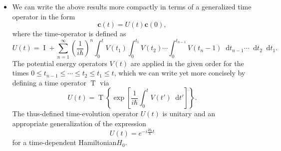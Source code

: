 \documentclass[11pt, a4paper]{article}
\newcommand{\diff}{\mathop{}\!\mathrm{d}} %
\newcommand{\Ham}{Hamiltonian\xspace}
\renewcommand{\vec}[1]{\bm{#1}}  %
\newcommand{\II}{\operatorname{I}}  %
\begin{document}
\begin{itemize}
    \item We can write the above results more compactly in terms of a generalized time operator in the form
    \begin{equation*}
        \vec{c}(t) = U(t)\vec{c}(0),
    \end{equation*}
    where the time-operator is defined as
    \begin{equation*}
        U(t) = \II + \sum_{n = 1}^{\infty} \left( \frac{1}{i \hbar} \right)^{n} \int_{0}^{t}V(t_{1}) \int_{0}^{t_{1}}V(t_{2}) \cdots \int_{0}^{t_{n-1}} V(t_{n} - 1)\diff t_{n-1} \cdots \diff t_{2} \diff t_{1}.
    \end{equation*}
    The potential energy operators $ V(t) $ are applied in the given order for the times
    $ 0 \leq t_{n-1} \leq \cdots \leq t_{2} \leq t_{1} \leq t $, which we can write yet more concisely by defining a time operator $ \operatorname{T} $ via
    \begin{equation*}
        U(t) = \operatorname{T} \left\{ \exp \left[ \frac{1}{i \hbar} \int_{0}^{t}V(t')\diff t'\right] \right\}.
    \end{equation*}
    The thus-defined time-evolution operator $ U(t) $ is unitary and an appropriate generalization of the expression
    \begin{equation*}
        U(t) = e^{-i \frac{H_{0}}{\hbar}t}
    \end{equation*}
    for a time-dependent \Ham $ H_{0} $.
    
\end{itemize}
\end{document}
